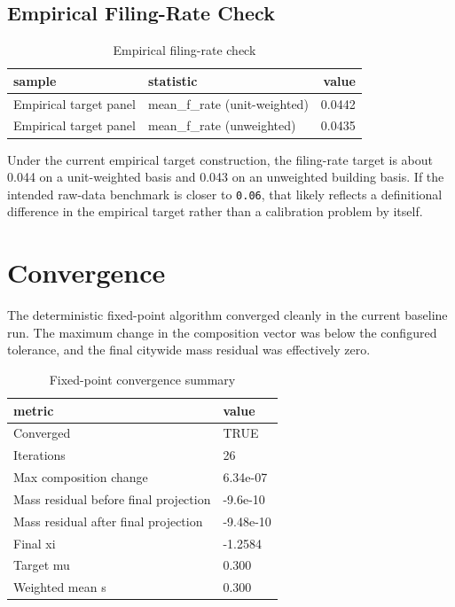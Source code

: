 \documentclass[
  11pt,
]{article}
\begin{document}
\subsection{Empirical Filing-Rate
Check}\label{empirical-filing-rate-check}

\begin{table}

\caption{Empirical filing-rate check}
\centering
\begin{tabular}[t]{llr}
\toprule
sample & statistic & value\\
\midrule
Empirical target panel & mean\_f\_rate (unit-weighted) & 0.0442\\
Empirical target panel & mean\_f\_rate (unweighted) & 0.0435\\
\bottomrule
\end{tabular}
\end{table}

Under the current empirical target construction, the filing-rate target
is about 0.044 on a unit-weighted basis and 0.043 on an unweighted
building basis. If the intended raw-data benchmark is closer to
\texttt{0.06}, that likely reflects a definitional difference in the
empirical target rather than a calibration problem by itself.

\section{Convergence}\label{convergence}

The deterministic fixed-point algorithm converged cleanly in the current
baseline run. The maximum change in the composition vector was below the
configured tolerance, and the final citywide mass residual was
effectively zero.

\begin{table}

\caption{Fixed-point convergence summary}
\centering
\begin{tabular}[t]{ll}
\toprule
metric & value\\
\midrule
Converged & TRUE\\
Iterations & 26\\
Max composition change & 6.34e-07\\
Mass residual before final projection & -9.6e-10\\
Mass residual after final projection & -9.48e-10\\
Final xi & -1.2584\\
Target mu & 0.300\\
Weighted mean s & 0.300\\
\bottomrule
\end{tabular}
\end{table}
\end{document}
